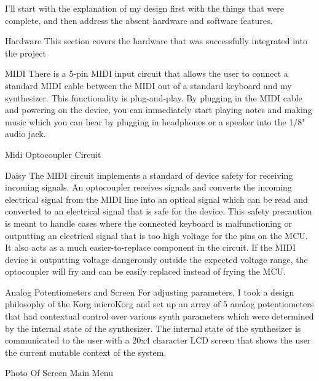 \documentclass[acmlarge,screen]{acmart}
\begin{document}
I'll start with the explanation of my design first with the things that were complete, and then address the absent hardware and software features.

Hardware
This section covers the hardware that was successfully integrated into the project

MIDI
There is a 5-pin MIDI input circuit that allows the user to connect a standard MIDI cable between the MIDI out of a standard keyboard and my synthesizer. This functionality is plug-and-play. By plugging in the MIDI cable and powering on the device, you can immediately start playing notes and making music which you can hear by plugging in headphones or a speaker into the 1/8" audio jack.

Midi Optocoupler Circuit

Daisy
The MIDI circuit implements a standard of device safety for receiving incoming signals. An optocoupler receives signals and converts the incoming electrical signal from the MIDI line into an optical signal which can be read and converted to an electrical signal that is safe for the device. This safety precaution is meant to handle cases where the connected keyboard is malfunctioning or outputting an electrical signal that is too high voltage for the pins on the MCU. It also acts as a much easier-to-replace component in the circuit. If the MIDI device is outputting voltage dangerously outside the expected voltage range, the optocoupler will fry and can be easily replaced instead of frying the MCU.

Analog Potentiometers and Screen
For adjusting parameters, I took a design philosophy of the Korg microKorg and set up an array of 5 analog potentiometers that had contextual control over various synth parameters which were determined by the internal state of the synthesizer. The internal state of the synthesizer is communicated to the user with a 20x4 character LCD screen that shows the user the current mutable context of the system.

Photo Of Screen Main Menu
\end{document}
